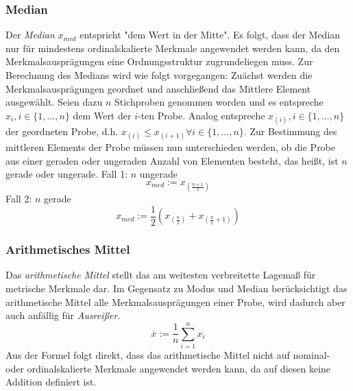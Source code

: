 \documentclass[a4paper]{scrartcl}
\begin{document}
\begin{multicols}{2}
                    \subsubsection{Median}
                        Der \emph{Median} $x_{med}$ entspricht "dem Wert in der Mitte". Es folgt, dass der Median nur für mindestens ordinalskalierte Merkmale angewendet werden kann, da den Merkmalsausprägungen eine Ordnungsstruktur zugrundeliegen muss. \cite{kohn2005}
                        \newline
                        Zur Berechnung des Medians wird wie folgt vorgegangen: Zuächst werden die Merkmalsausprägungen geordnet und anschließend das Mittlere Element ausgewählt. Seien dazu $n$ Stichproben genommen worden und es entspreche $x_i,i \in \{1,\dots,n\}$ dem Wert der $i$-ten Probe. Analog entspreche $x_{(i)}, i \in \{1,\dots,n\}$ der geordneten Probe, d.h. $x_{(i)} \leq x_{(i+1)} \forall i \in \{1,\dots,n\}$.
                        \newline
                        Zur Bestimmung des mittleren Elements der Probe müssen nun unterschieden werden, ob die Probe aus einer geraden oder ungeraden Anzahl von Elementen besteht, das heißt, ist $n$ gerade oder ungerade.
                        \newline
                        Fall 1:
                        \newline
                        $n$ ungerade
                        $$ x_{med} := x_{(\frac{n+1}{2})} $$
                        Fall 2:
                        \newline
                        $n$ gerade
                        $$ x_{med} := \frac{1}{2}\left( x_{(\frac{n}{2})} + x_{(\frac{n}{2}+1)} \right) $$
                    \subsubsection{Arithmetisches Mittel}
                        Das \emph{arithmetische Mittel} stellt das am weitesten verbreitette Lagemaß für metrische Merkmale dar. Im Gegensatz zu Modus und Median berücksichtigt das arithmetische Mittel alle Merkmalsausprägungen einer Probe, wird dadurch aber auch anfällig für \emph{Ausreißer}.
                        $$ \bar{x} := \frac{1}{n}\sum_{i=1}^nx_i $$ 
                        Aus der Formel folgt direkt, dass das arithmetische Mittel nicht auf nominal- oder ordinalskalierte Merkmale angewendet werden kann, da auf diesen keine Addition definiert ist.


\end{multicols}
\end{document}
